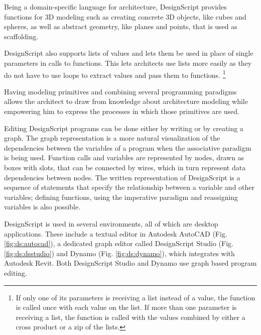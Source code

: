 Being a domain-specific language for architecture, DesignScript provides functions for 3D modeling such as creating concrete 3D objects, like cubes and spheres, as well as abstract geometry, like planes and points, that is used as scaffolding.

DesignScript also supports lists of values and lets them be used in place of single parameters in calls to functions.
This lets architects use lists more easily as they do not have to use loops to extract values and pass them to functions.%
\footnote{If only one of its parameters is receiving a list instead of a value, the function is called once with each value on the list.
If more than one parameter is receiving a list, the function is called with the values combined by either a cross product or a zip of the lists.}

Having modeling primitives and combining several programming paradigms allows the architect to draw from knowledge about architecture modeling while empowering him to express the processes in which those primitives are used.

Editing DesignScript programs can be done either by writing or by creating a graph.
The graph representation is a more natural visualization of the dependencies between the variables of a program when the associative paradigm is being used.
Function calls and variables are represented by nodes, drawn as boxes with slots, that can be connected by wires, which in turn represent data dependencies between nodes.
The written representation of DesignScript is a sequence of statements that specify the relationship between a variable and other variables; defining functions, using the imperative paradigm and reassigning variables is also possible.

DesignScript is used in several environments, all of which are desktop applications.
These include a textual editor in Autodesk AutoCAD (Fig. \ref{fig:ds:autocad}), a dedicated graph editor called DesignScript Studio (Fig. \ref{fig:ds:dsstudio}) and Dynamo (Fig. \ref{fig:ds:dynamo}), which integrates with Autodesk Revit.
Both DesignScript Studio and Dynamo use graph based program editing.

